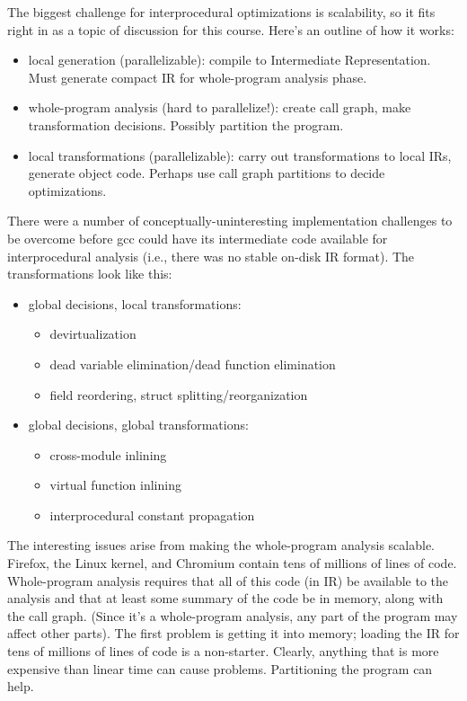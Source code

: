 The biggest challenge for interprocedural optimizations is scalability, so 
it fits right in as a topic of discussion for this course.
Here's an outline of how it works:
\begin{itemize}[noitemsep]
\item local generation (parallelizable): compile to Intermediate Representation. Must generate compact
IR for whole-program analysis phase.
\item whole-program analysis (hard to parallelize!): create call graph, make transformation decisions. Possibly partition
the program.
\item local transformations (parallelizable): carry out transformations to local IRs, generate object code.
Perhaps use call graph partitions to decide optimizations. 
\end{itemize}
There were a number of conceptually-uninteresting implementation
challenges to be overcome before gcc could have its intermediate code available for
interprocedural analysis (i.e., there was no stable on-disk IR format). The transformations look like this:
\begin{itemize}[noitemsep]
\item global decisions, local transformations:
\begin{itemize}[noitemsep]
\item devirtualization
\item dead variable elimination/dead function elimination
\item field reordering, struct splitting/reorganization
\end{itemize}
\item global decisions, global transformations:
\begin{itemize}[noitemsep]
\item cross-module inlining
\item virtual function inlining
\item interprocedural constant propagation
\end{itemize}
\end{itemize}
The interesting issues arise from making the whole-program analysis scalable. Firefox, the Linux kernel,
and Chromium contain tens of millions of lines of code. Whole-program analysis requires that all of 
this code (in IR) be available to the analysis and that at least some summary of the code be in memory, 
along with the call graph.
(Since it's a whole-program analysis, any part of the program may affect other parts). The first problem
is getting it into memory; loading the IR for tens of millions of lines of code is a non-starter.
Clearly, anything that is more expensive than linear time can cause problems. Partitioning the program
can help.


